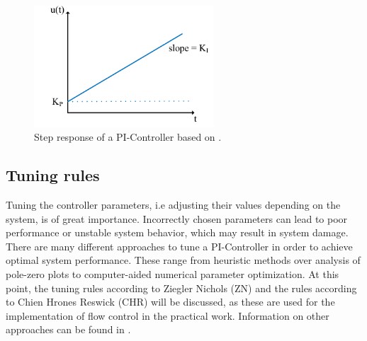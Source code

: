 \begin{figure}[ht]
   \centering
   \includegraphics[width=0.6\textwidth]{images/chapt_3/step_resp_pi.pdf}
   \caption[Step response of a PI-Controller]{Step response of a PI-Controller based on \cite{Reg_17}.}
   \label{fig:step_resp_pi}
 \end{figure}

\subsection{Tuning rules}
Tuning the controller parameters, i.e adjusting their values depending on the system, is of great importance. Incorrectly chosen parameters can lead to poor performance or unstable system behavior, which may result in system damage. There are many different approaches to tune a PI-Controller in order to achieve optimal system performance. These range from heuristic methods over analysis of pole-zero plots to computer-aided numerical parameter optimization. \cite{Reg_10} At this point, the tuning rules according to Ziegler Nichols (ZN) and the rules according to Chien Hrones Reswick (CHR) will be discussed, as these are used for the implementation of flow control in the practical work. Information on other approaches can be found in \cite{Reg_11}.

